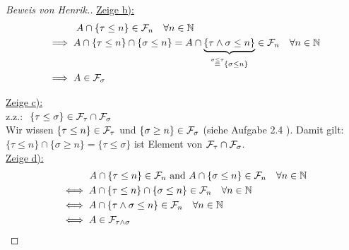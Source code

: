 \documentclass[12pt,a4paper]{article}
\begin{document}
\begin{proof}[Beweis von Henrik.]
\underline{Zeige b):}\\
\begin{align*}
	&{}\qquad \quad  A \cap \{\tau \leq n\}  \in \mathcal{F}_n \quad \forall n \in \mathbb{N}\\
	&\implies A \cap \{\tau \leq n\} \cap \{\sigma \leq n\} = A \cap \underbrace{ \{\tau \land \sigma \leq n\}}_{ \overset{\sigma \leq \tau}{=} \{\sigma \leq n\} } \in \mathcal{F}_n \quad \forall n \in \mathbb{N}\\
	&\implies A \in \mathcal{F}_\sigma \\
\end{align*}


\underline{Zeige c):}\\
z.z.: $\ \{\tau \leq \sigma\} \in \mathcal{F}_\tau \cap \mathcal{F}_\sigma$\\
Wir wissen $\{\tau \leq n\} \in \mathcal{F}_\tau$ und  $\{\sigma \geq n\} \in \mathcal{F}_\sigma$ (siehe Aufgabe 2.4 ). Damit gilt: $\{\tau \leq n\} \cap \{\sigma \geq n\} = \{\tau \leq \sigma\} $ ist Element von $\mathcal{F}_\tau \cap \mathcal{F}_\sigma$.\\

\underline{Zeige d):}\\
\begin{align*}
&{} \qquad \quad  A \cap \{\tau \leq n\}\in \mathcal{F}_n \text{ and } A \cap\{\sigma \leq n\}\in \mathcal{F}_n \quad \forall n \in \mathbb{N}\\
&\iff  A \cap \{\tau \leq n\} \cap \{\sigma \leq n\}\in \mathcal{F}_n \quad \forall n \in \mathbb{N} \\
&\iff  A \cap \{\tau \land \sigma \leq n\} \in \mathcal{F}_n \quad \forall n \in \mathbb{N}\\
&\iff A \in \mathcal{F}_{\tau \land \sigma} \\
\end{align*}

\end{proof}
\end{document}
